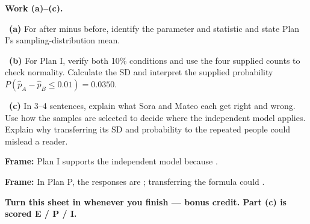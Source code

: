 \documentclass[11pt]{article}
\begin{document}
\newpage
\textbf{Work (a)--(c).}\par\smallskip

~\textbf{(a)} For after minus before, identify the parameter and statistic and state Plan I's sampling-distribution mean.\par
\workspace{0.8in}

~\textbf{(b)} For Plan I, verify both 10\% conditions and use the four supplied counts to check normality. Calculate the SD and interpret the supplied probability $P(\widehat p_A-\widehat p_B\leq0.01)=0.0350$.\par
\workspace{1.4in}

~\textbf{(c)} In 3--4 sentences, explain what Sora and Mateo each get right and wrong. Use how the samples are selected to decide where the independent model applies. Explain why transferring its SD and probability to the repeated people could mislead a reader.\par
\workspace{2.0in}

\begin{sentenceframebox}\raggedright\textbf{Frame:} Plan I supports the independent model because \blank[2.9in].\end{sentenceframebox}

\begin{sentenceframebox}\raggedright\textbf{Frame:} In Plan P, the responses are \blank[1.4in]; transferring the formula could \blank[2.6in].\end{sentenceframebox}

\textbf{Turn this sheet in whenever you finish --- bonus credit. Part (c) is scored E / P / I.}\par
\end{document}
